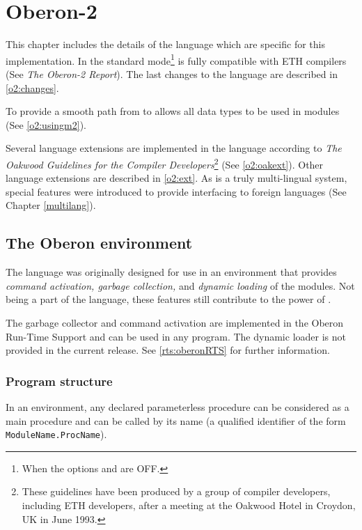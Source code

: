 \chapter{\XDS{} Oberon-2}\label{o2}

This chapter includes the details of the \ot{} language which are
specific for this implementation.
In the standard mode\footnote{When the options 
and  are OFF.} \xds{} \ot{} is fully compatible with ETH compilers (See
{\em The Oberon-2 Report}). The last changes        %
to the language are described in \ref{o2:changes}.

To provide a smooth path from \mt{} to \ot{} \XDS{} allows
all \mt{} data types to be used in \ot{} modules (See \ref{o2:usingm2}).

Several language extensions are implemented in the language according to
{\em The Oakwood Guidelines for the \ot{} Compiler Developers}\footnote{These
guidelines have been produced by a group of
\ot{} compiler developers, including ETH developers,
after a meeting at the Oakwood Hotel in Croydon, UK in June 1993.}
(See \ref{o2:oakext}). Other language extensions are described in
\ref{o2:ext}. As \xds{} is a truly multi-lingual
system, special features were introduced to provide interfacing to
foreign languages (See Chapter \ref{multilang}).

\section{The Oberon environment}\label{o2:env}

The \ot{} language was originally designed for use in an
environment that provides {\em command activation, garbage
collection,}  and {\em dynamic loading}
of the modules. Not being a part of the language, these features still
contribute to the power of \ot{}.

The garbage collector and command activation are implemented in
the Oberon Run-Time Support  and
can be used in any program. The dynamic loader is not
provided in the current release. See
\ref{rts:oberonRTS} for further information.

\subsection{Program structure}\label{o2:env:main}

In an \ot{} environment, any declared parameterless procedure
can be considered as a main procedure and can be called by its
name (a qualified identifier of the form
\verb|ModuleName.ProcName|).

